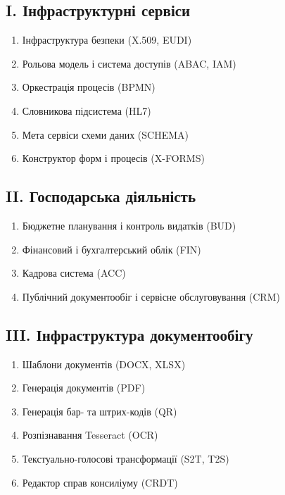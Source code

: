 \subsection{I. Інфраструктурні сервіси}
\begin{enumerate}
    \item Інфраструктура безпеки (X.509, EUDI)
    \item Рольова модель і система доступів (ABAC, IAM)
    \item Оркестрація процесів (BPMN)
    \item Словникова підсистема (HL7)
    \item Мета сервіси схеми даних (SCHEMA)
    \item Конструктор форм і процесів (X-FORMS)
\end{enumerate}

\subsection{II. Господарська діяльність}
\begin{enumerate}
    \item Бюджетне планування і контроль видатків (BUD)
    \item Фінансовий і бухгалтерський облік (FIN)
    \item Кадрова система (ACC)
    \item Публічний документообіг і сервісне обслуговування (CRM)
\end{enumerate}

\subsection{III. Інфраструктура документообігу}
\begin{enumerate}
    \item Шаблони документів (DOCX, XLSX)
    \item Генерація документів (PDF)
    \item Генерація бар- та штрих-кодів (QR)
    \item Розпізнавання Tesseract (OCR)
    \item Текстуально-голосові трансформації (S2T, T2S)
    \item Редактор справ консиліуму (CRDT)
\end{enumerate}

